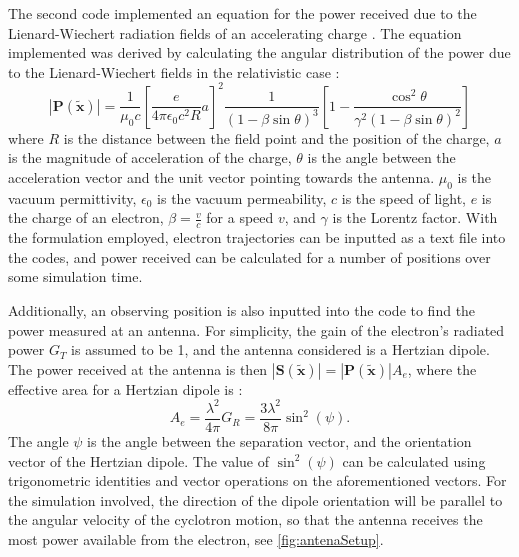 \documentclass[a4paper,12pt, notitlepage]{article}
\begin{document}
The second code implemented an equation for the power received due to the Lienard-Wiechert radiation fields of an accelerating charge \cite{Jackson1999}. The equation implemented was derived by calculating the angular distribution of the power due to the Lienard-Wiechert fields in the relativistic case \cite{private1}:
\begin{equation}
    |\boldsymbol{P}(\boldsymbol{\tilde{x}})| = \dfrac{1}{\mu_{0}c}\left[\dfrac{e}{4\pi\epsilon_{0}c^{2}R}a\right]^{2}\dfrac{1}{(1 - \beta\sin\theta)^{3}}\left[1 - \dfrac{\cos^{2}\theta}{\gamma^{2}(1 - \beta\sin\theta)^{2}}\right]
\end{equation}
where $R$ is the distance between the field point and the position of the charge, $a$ is the magnitude of acceleration of the charge, $\theta$ is the angle between the acceleration vector and the unit vector pointing towards the antenna. $\mu_{0}$ is the vacuum permittivity, $\epsilon_{0}$ is the vacuum permeability, $c$ is the speed of light, $e$ is the charge of an electron, $\beta = \frac{v}{c}$ for a speed $v$, and $\gamma$ is the Lorentz factor. 
With the formulation employed, electron trajectories can be inputted as a text file into the codes, and power received can be calculated for a number of positions over some simulation time.
 
Additionally, an observing position is also inputted into the code to find the power measured at an antenna. For simplicity, the gain of the electron's radiated power $G_{T}$ is assumed to be 1, and the antenna considered is a Hertzian dipole. The power received at the antenna is then  $|\boldsymbol{S}(\boldsymbol{\tilde{x}})| = |\boldsymbol{P}(\boldsymbol{\tilde{x}})|A_{e}$, where the effective area for a Hertzian dipole is \cite{Visser2012}: 
\begin{equation}
    A_{e} = \dfrac{\lambda^{2}}{4\pi}G_{R} = \dfrac{3\lambda^{2}}{8\pi}\sin^{2}(\psi).
\end{equation}
The angle $\psi$ is the angle between the separation vector, and the orientation vector of the Hertzian dipole. The value of $\sin^{2}(\psi)$ can be calculated using trigonometric identities and vector operations on the aforementioned vectors. For the simulation involved, the direction of the dipole orientation will be parallel to the angular velocity of the cyclotron motion, so that the antenna receives the most power available from the electron, see \cref{fig:antenaSetup}.
 
\end{document}
